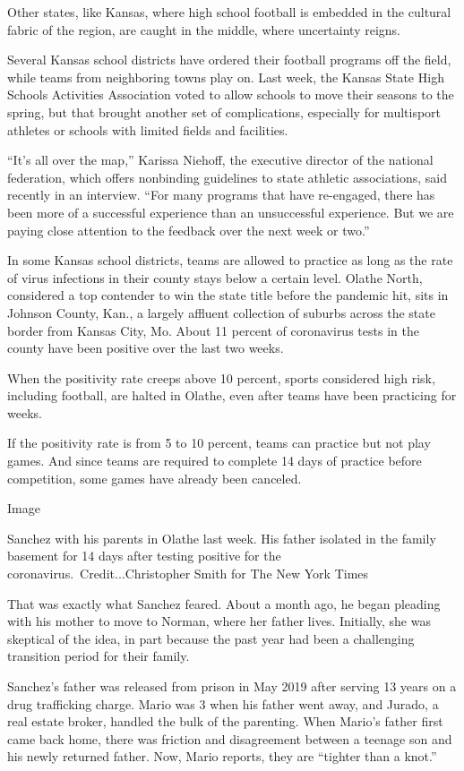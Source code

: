 Other states, like Kansas, where high school football is embedded in the
cultural fabric of the region, are caught in the middle, where
uncertainty reigns.

Several Kansas school districts have ordered their football programs off
the field, while teams from neighboring towns play on. Last week, the
Kansas State High Schools Activities Association voted to allow schools
to move their seasons to the spring, but that brought another set of
complications, especially for multisport athletes or schools with
limited fields and facilities.

``It's all over the map,'' Karissa Niehoff, the executive director of
the national federation, which offers nonbinding guidelines to state
athletic associations, said recently in an interview. ``For many
programs that have re-engaged, there has been more of a successful
experience than an unsuccessful experience. But we are paying close
attention to the feedback over the next week or two.''

In some Kansas school districts, teams are allowed to practice as long
as the rate of virus infections in their county stays below a certain
level. Olathe North, considered a top contender to win the state title
before the pandemic hit, sits in Johnson County, Kan., a largely
affluent collection of suburbs across the state border from Kansas City,
Mo. About 11 percent of coronavirus tests in the county have been
positive over the last two weeks.

When the positivity rate creeps above 10 percent, sports considered high
risk, including football, are halted in Olathe, even after teams have
been practicing for weeks.

If the positivity rate is from 5 to 10 percent, teams can practice but
not play games. And since teams are required to complete 14 days of
practice before competition, some games have already been canceled.

Image

Sanchez with his parents in Olathe last week. His father isolated in the
family basement for 14 days after testing positive for the
coronavirus.~Credit...Christopher Smith for The New York Times

That was exactly what Sanchez feared. About a month ago, he began
pleading with his mother to move to Norman, where her father lives.
Initially, she was skeptical of the idea, in part because the past year
had been a challenging transition period for their family.

Sanchez's father was released from prison in May 2019 after serving 13
years on a drug trafficking charge. Mario was 3 when his father went
away, and Jurado, a real estate broker, handled the bulk of the
parenting. When Mario's father first came back home, there was friction
and disagreement between a teenage son and his newly returned father.
Now, Mario reports, they are ``tighter than a knot.''


